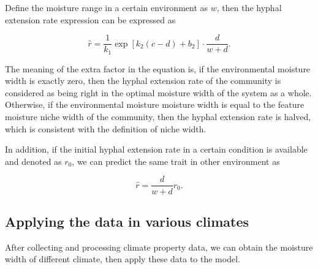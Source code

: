 Define the moisture range in a certain environment as $w$, then the hyphal extension rate expression can be expressed as

\begin{equation}
    \hat{r} =
    \frac{1}{k_1} \exp[k_2(c -d) +b_2]\cdot
    \frac{d}{w + d}.
\end{equation}

The meaning of the extra factor in the equation is, if the environmental moisture width is exactly zero, then the hyphal extension rate of the community is considered as being right in the optimal moisture width of the system as a whole. Otherwise, if the environmental moisture moisture width is equal to the feature moisture niche width of the community, then the hyphal extension rate is halved, which is consistent with the definition of niche width.

In addition, if the initial hyphal extension rate in a certain condition is available and denoted as $r_0$, we can predict the same trait in other environment as

\begin{equation}\label{eq:env}
    \hat{r} = \frac{d}{w + d}r_0.
\end{equation}

\subsection{Applying the data in various climates}

After collecting and processing climate property data, we can obtain the moisture width of different climate, then apply these data to the model.

